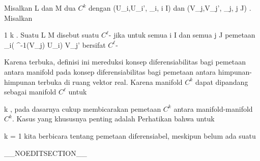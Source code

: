 
{}
{

Misalkan
\mathkor {} {L} {dan} {M} {}
dua
$C^k$ dengan
\mathkor {} {(U_i,U_i', \alpha_i, i \in I)} {dan} {(V_j,V_j', \beta_j, j \in J)} {.}
Misalkan

\mavergleichskette
{\vergleichskette
{ 1
}
{ \leq }{ \ell
}
{ \leq }{ k
}
{    }{
}
{   }{
}
}
{}{}{.}
Suatu
\maabbdisp {\varphi} { L } { M
} {}
disebut suatu $C^\ell$- jika untuk semua
\mathkor {} {i \in I} {dan semua} {j \in J} {}
pemetaan
 {\alpha_i( \varphi^{-1}(V_j) \cap U_i) } { V_j'
} {}
bersifat
$C^\ell$-

}

Karena
 terbuka, definisi ini mereduksi konsep diferensiabilitas bagi pemetaan antara manifold pada konsep diferensiabilitas bagi pemetaan antara himpunan-himpunan terbuka di ruang vektor real. Karena manifold $C^k$ dapat dipandang sebagai manifold $C^\ell$ untuk

\mavergleichskette
{\vergleichskette
{ \ell
}
{ \leq }{ k
}
{  }{
}
{    }{
}
{   }{
}
}
{}{}{}
,
pada dasarnya cukup membicarakan pemetaan $C^k$ antara manifold-manifold $C^k$. Kasus yang khususnya penting adalah
 Perhatikan bahwa untuk

\mavergleichskette
{\vergleichskette
{ k
}
{ = }{ 1
}
{  }{
}
{    }{
}
{   }{
}
}
{}{}{}
kita berbicara tentang pemetaan diferensiabel, meskipun
 {} {}
belum ada suatu 

__NOEDITSECTION__

